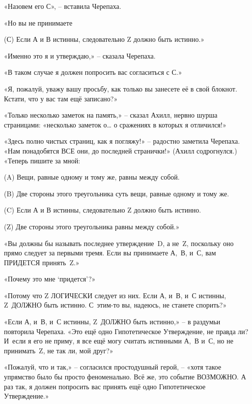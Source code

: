\documentclass[../main.tex]{subfiles}
\begin{document}
«Назовем его С», \--- вставила Черепаха.

«Но вы не принимаете

\begin{statements}
    \item[(С)] Если А и В истинны, следовательно Z должно быть истинно.»
\end{statements}

«Именно это я и утверждаю,» \--- сказала Черепаха.

«В таком случае я должен попросить вас согласиться с С.»

«Я, пожалуй, уважу вашу просьбу, как только вы занесете её в свой блокнот. Кстати, что у вас там ещё записано?»

«Только несколько заметок на память,» \--- сказал Ахилл, нервно шурша страницами: «несколько заметок о\ldots{} о сражениях в которых я отличился!»

«Здесь полно чистых страниц, как я погляжу!» \--- радостно заметила Черепаха. «Нам понадобятся ВСЕ они, до последней странички!» (Ахилл содрогнулся.) «Теперь пишите за мной:

\begin{statements}
    \item[(A)] Вещи, равные одному и тому же, равны между собой.
    \item[(B)] Две стороны этого треугольника суть вещи, равные одному и тому же.
    \item[(C)] Если А и В истинны, следовательно Z должно быть истинно.
    \item[(Z)] Две стороны этого треугольника равны между собой.»
\end{statements}

«Вы должны бы называть последнее утверждение~D, а не~Z, поскольку оно прямо следует за первыми тремя. Если вы принимаете А,~В, и~С, вам ПРИДЕТСЯ принять~Z.»

«Почему это мне \enquote*{придется}?»

«Потому что Z ЛОГИЧЕСКИ следует из них. Если А, и~В, и~С истинны, Z~ДОЛЖНО быть истинно. С~этим-то вы, надеюсь, не станете спорить?»

«Если А, и~В, и~С истинны, Z~ДОЛЖНО быть истинно,» \--- в раздумьи повторила Черепаха. «Это ещё одно Гипотетическое Утверждение, не правда ли? И~если я его не приму, я все ещё могу считать истинными А,~В и~С, но не принимать~Z, не так ли, мой друг?»

«Пожалуй, что и так,» \--- согласился простодушный герой, \--- «хотя такое упрямство было бы просто феноменально. Всё же, это событие ВОЗМОЖНО\@. А раз так, я должен попросить вас принять ещё одно Гипотетическое Утверждение.»
\end{document}
